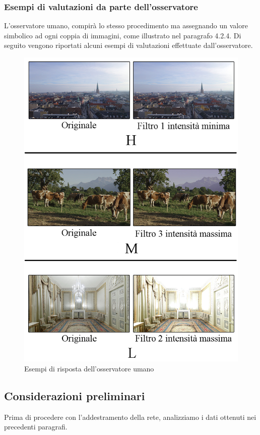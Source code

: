 \documentclass[a4paper,11pt]{article}
\begin{document}
    \subsubsection{Esempi di valutazioni da parte dell'osservatore}
    L'osservatore umano, compirà lo stesso procedimento ma assegnando un valore simbolico ad ogni coppia di immagini, come illustrato nel paragrafo 4.2.4.
    Di seguito vengono riportati alcuni esempi di valutazioni effettuate dall'osservatore.
    \begin{figure}[h]
        \centering
        \includegraphics[scale=0.3]{confronto.png}
        \caption{Esempi di risposta dell'osservatore umano}
    \end{figure}
    \newpage
    \subsection{Considerazioni preliminari}
    Prima di procedere con l'addestramento della rete, analizziamo i dati ottenuti nei precedenti paragrafi. 
\end{document}
